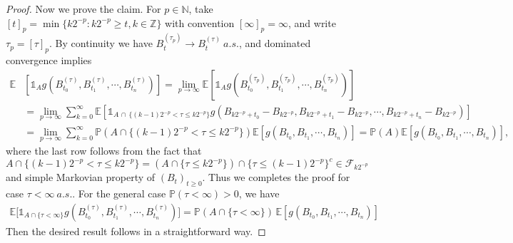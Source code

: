 \documentclass{article}
\numberwithin{equation}{section}
\newcommand{\E}{\mathbb{E}}
\renewcommand{\P}{\mathbb{P}}
\theoremstyle{plain}
\theoremstyle{definition}
\begin{document}
\begin{proof}
Now we prove the claim. For $p\in\mathbb{N}$, take $[t]_p=\min\{k2^{-p}:k2^{-p}\geq t,k\in\mathbb{Z}\}$ with convention $[\infty]_p=\infty$, and write $\tau_p=[\tau]_p$. By continuity we have $B_t^{(\tau_p)}\to B_t^{(\tau)}\ a.s.$, and dominated convergence implies
\begin{align*}
\E&\left[\mathds{1}_A g(B_{t_0}^{(\tau)},B_{t_1}^{(\tau)},\cdots,B_{t_n}^{(\tau)})\right]=\lim_{p\to\infty}\E\left[\mathds{1}_A g(B_{t_0}^{(\tau_p)},B_{t_1}^{(\tau_p)},\cdots,B_{t_n}^{(\tau_p)})\right]\\
&=\lim_{p\to\infty}\sum_{k=0}^\infty\E\left[\mathds{1}_{A\,\cap\, \{(k-1)2^{-p}<\tau\leq k2^{-p}\}}g\left(B_{k2^{-p}+t_0}-B_{k2^{-p}},B_{k2^{-p}+t_1}-B_{k2^{-p}},\cdots,B_{k2^{-p}+t_n}-B_{k2^{-p}}\right)\right]\\
&=\lim_{p\to\infty}\sum_{k=0}^\infty\P(A\cap \{(k-1)2^{-p}<\tau\leq k2^{-p}\})\E\left[g\left(B_{t_0},B_{t_1},\cdots,B_{t_n}\right)\right]=\P(A)\E\left[g\left(B_{t_0},B_{t_1},\cdots,B_{t_n}\right)\right],
\end{align*}
where the last row follows from the fact that $$A\cap \{(k-1)2^{-p}<\tau\leq k2^{-p}\}=\left(A\cap\{\tau\leq k2^{-p}\}\right)\cap\{\tau\leq(k-1)2^{-p}\}^c\in\mathscr{F}_{k2^{-p}}$$ and simple Markovian property of $(B_t)_{t\geq 0}$. Thus we completes the proof for case $\tau<\infty\ a.s.$. For the general case $\P(\tau<\infty)>0$, we have
\begin{align*}
	\E\bigl[\mathds{1}_{A\cap\{\tau<\infty\}} g(B_{t_0}^{(\tau)},B_{t_1}^{(\tau)},\cdots,B_{t_n}^{(\tau)})\bigr] = \P(A\cap\{\tau<\infty\})\,\E\left[g(B_{t_0},B_{t_1},\cdots,B_{t_n})\right]
\end{align*} 
Then the desired result follows in a straightforward way.
\end{proof}
\end{document}
